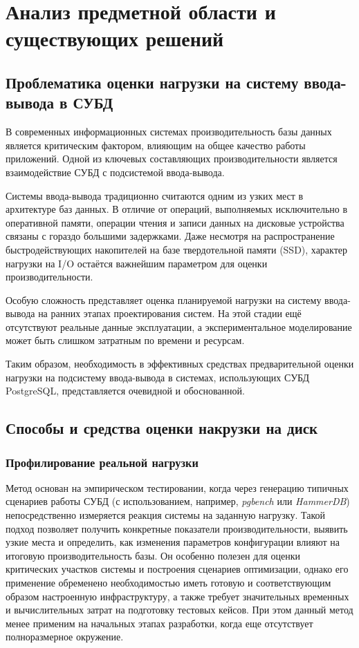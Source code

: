\section{Анализ предметной области и существующих решений}

\subsection{Проблематика оценки нагрузки на систему ввода-вывода в СУБД}

В современных информационных системах производительность базы данных является критическим фактором, влияющим на общее качество работы приложений. Одной из ключевых составляющих производительности является взаимодействие СУБД с подсистемой ввода-вывода. \cite{vershinin2023optimization}

Системы ввода-вывода традиционно считаются одним из узких мест в архитектуре баз данных. В отличие от операций, выполняемых исключительно в оперативной памяти, операции чтения и записи данных на дисковые устройства связаны с гораздо большими задержками. Даже несмотря на распространение быстродействующих накопителей на базе твердотельной памяти (SSD), характер нагрузки на I/O остаётся важнейшим параметром для оценки производительности. \cite{hellerstein2007architecture} \cite{malykh2022migration}

Особую сложность представляет оценка планируемой нагрузки на систему ввода-вывода на ранних этапах проектирования систем. На этой стадии ещё отсутствуют реальные данные эксплуатации, а экспериментальное моделирование может быть слишком затратным по времени и ресурсам.

Таким образом, необходимость в эффективных средствах предварительной оценки нагрузки на подсистему ввода-вывода в системах, использующих СУБД PostgreSQL, представляется очевидной и обоснованной.


\subsection{Способы и средства оценки накрузки на диск} 


\subsubsection{Профилирование реальной нагрузки}
Метод основан на эмпирическом тестировании, когда через генерацию типичных сценариев работы СУБД (с использованием, например, \textit{pgbench} или \textit{HammerDB}) непосредственно измеряется реакция системы на заданную нагрузку. Такой подход позволяет получить конкретные показатели производительности, выявить узкие места и определить, как изменения параметров конфигурации влияют на итоговую производительность базы. Он особенно полезен для оценки критических участков системы и построения сценариев оптимизации, однако его применение обременено необходимостью иметь готовую и соответствующим образом настроенную инфраструктуру, а также требует значительных временных и вычислительных затрат на подготовку тестовых кейсов. При этом данный метод менее применим на начальных этапах разработки, когда еще отсутствует полноразмерное окружение.

